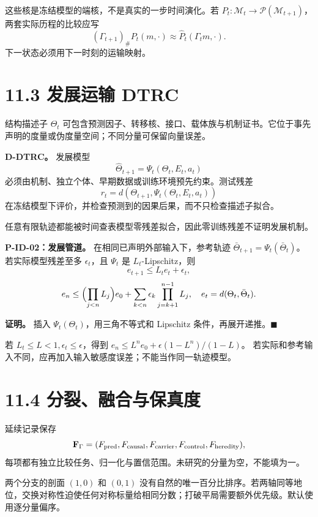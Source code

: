 \documentclass[
  11pt,
  oneside]{book}
\begin{document}
这些核是冻结模型的端核，不是真实的一步时间演化。若 \(P_t:\mathcal M_t\to\mathcal P(\mathcal M_{t+1})\)，两套实际历程的比较应写 \[(\Gamma_{t+1})_\#P_t(m,\cdot)
\approx\widehat P_t(\Gamma_tm,\cdot).\] 下一状态必须用下一时刻的运输映射。

\section{11.3 发展运输 DTRC}\label{ux53d1ux5c55ux8fd0ux8f93-dtrc}

结构描述子 \(\Theta_t\) 可包含预测因子、转移核、接口、载体族与机制证书。它位于事先声明的度量或伪度量空间；不同分量可保留向量误差。

\textbf{D-DTRC。} 发展模型 \[\widehat\Theta_{t+1}=\Psi_t(\Theta_t,E_t,a_t)\] 必须由机制、独立个体、早期数据或训练环境预先约束。测试残差 \[r_t=d(\Theta_{t+1},\Psi_t(\Theta_t,E_t,a_t))\] 在冻结模型下评价，并检查预测到的因果后果，而不只检查描述子拟合。

任意有限轨迹都能被时间查表模型零残差拟合，因此零训练残差不证明发展机制。

\hypertarget{p-id-02}{}\label{p-id-02}

\textbf{P-ID-02：发展管道。} 在相同已声明外部输入下，参考轨迹 \(\bar\Theta_{t+1}=\Psi_t(\bar\Theta_t)\)。若实际模型残差至多 \(\epsilon_t\)，且 \(\Psi_t\) 是 \(L_t\)-Lipschitz，则 \[e_{t+1}\le L_te_t+\epsilon_t,\] \[e_n\le\Bigl(\prod_{j<n}L_j\Bigr)e_0+
\sum_{k<n}\epsilon_k\prod_{j=k+1}^{n-1}L_j,
\quad e_t=d(\Theta_t,\bar\Theta_t).\]

\textbf{证明。} 插入 \(\Psi_t(\Theta_t)\)，用三角不等式和 Lipschitz 条件，再展开递推。\(\blacksquare\)

若 \(L_t\le L<1,\epsilon_t\le\epsilon\)，得到 \(e_n\le L^ne_0+\epsilon(1-L^n)/(1-L)\)。 若实际和参考输入不同，应再加入输入敏感度误差；不能当作同一轨迹模型。

\section{11.4 分裂、融合与保真度}\label{ux5206ux88c2ux878dux5408ux4e0eux4fddux771fux5ea6}

延续记录保存 \[\mathbf F_\Gamma=
(F_{\rm pred},F_{\rm causal},F_{\rm carrier},
F_{\rm control},F_{\rm heredity}),\] 每项都有独立比较任务、归一化与置信范围。未研究的分量为空，不能填为一。

两个分支的剖面 \((1,0)\) 和 \((0,1)\) 没有自然的唯一百分比排序。若两轴同等地位，交换对称性迫使任何对称标量给相同分数；打破平局需要额外优先级。默认使用逐分量偏序。
\end{document}
